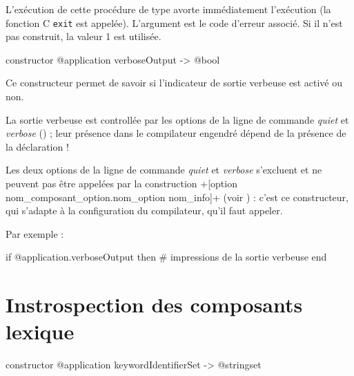 L'exécution de cette procédure de type avorte immédiatement l'exécution (la fonction C \texttt{exit} est appelée). L'argument est le code d'erreur associé. Si il n'est pas construit, la valeur 1 est utilisée.










\begin{galgas4box}
constructor @application verboseOutput -> @bool
\end{galgas4box}

Ce constructeur permet de savoir si l'indicateur de sortie verbeuse est activé ou non.

La sortie verbeuse est controllée par les options de la ligne de commande \emph{quiet} et \emph{verbose} () ; leur présence dans le compilateur engendré dépend de la présence de la déclaration \ggsq!%

Les deux options de la ligne de commande \emph{quiet} et \emph{verbose} s'excluent et ne peuvent pas être appelées par la construction \ggsq+[option nom_composant_option.nom_option nom_info]+ (voir ) : c'est ce constructeur, qui s'adapte à la configuration du compilateur, qu'il faut appeler.

Par exemple :
\begin{galgas4}
if @application.verboseOutput then
  # impressions de la sortie verbeuse
end
\end{galgas4}














\section{Instrospection des composants lexique}


\begin{galgas4box}
constructor @application keywordIdentifierSet -> @stringset
\end{galgas4box}


